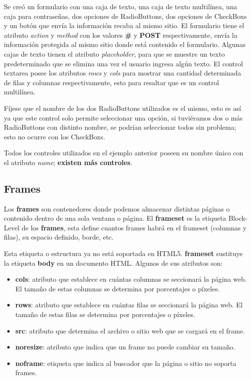 Se creó un formulario con una caja de texto, una caja de texto multilínea, una caja para contraseñas, dos opciones de RadioButtons, dos opciones de CheckBoxs y un botón que envía la información recaba al mismo sitio. El formulario tiene el atributo \textit{action} y \textit{method} con los valores \textbf{\#} y \textbf{POST} respectivamente, envía la información protegida al mismo sitio donde está contenido el formulario. Algunas cajas de texto tienen el atributo \textit{placeholder}, para que se muestre un texto predeterminado que se elimina una vez el usuario ingresa algún texto. El control textarea posee los atributos \textit{rows} y \textit{cols} para mostrar una cantidad determinada de filas y columnas respectivamente, esto para resaltar que es un control multilínea.

Fíjese que el nombre de los dos RadioButtons utilizados es el mismo, esto es así ya que este control solo permite seleccionar una opción, si tuviéramos dos o más RadioButtons con distinto nombre, se podrían seleccionar todos sin problema; esto no ocurre con los CheckBoxs.

Todos los controles utilizados en el ejemplo anterior poseen su nombre único con el atributo \textit{name}; \textbf{existen más controles}.


\subsection{Frames}

Los \textbf{frames} son contenedores donde podemos almacenar distintas páginas o contenido dentro de una sola ventana o página. El \textbf{frameset} es la etiqueta Block-Level de los \textbf{frames}, esta define cuantos frames habrá en el frameset (columnas y filas), su espacio definido, borde, etc.

Esta etiqueta o estructura ya no está soportada en HTML5. \textbf{frameset} sustituye la etiqueta \textbf{body} en un documento HTML. Algunos de sus atributos son:
\begin{itemize}
    \item \textbf{cols}: atributo que establece en cuántas columnas se seccionará la página web. El tamaño de estas columnas se determina por porcentajes o píxeles.
    \item \textbf{rows}: atributo que establece en cuántas filas se seccionará la página web. El tamaño de estas filas se determina por porcentajes o píxeles.
    \item \textbf{src}: atributo que determina el archivo o sitio web que se cargará en el frame.
    \item \textbf{noresize}: atributo que indica que un frame no puede cambiar su tamaño.
    \item \textbf{noframe}: etiqueta que indica al buscador que la página o sitio no soporta frames.
\end{itemize}

